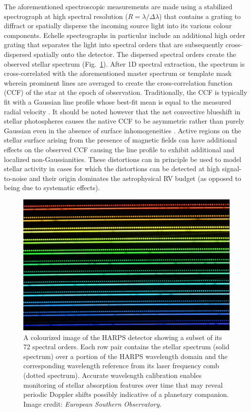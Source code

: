 The aforementioned
spectroscopic measurements are made using a stabilized spectrograph at high spectral resolution
($R=\lambda / \Delta \lambda$) that contains a grating to 
diffract or spatially disperse the incoming source light into its various colour components.
Echelle spectrographs in particular include an additional high order grating that separates the
light into spectral orders that are subsequently cross-dispersed spatially onto the detector. The
dispersed spectral orders create the observed stellar spectrum (Fig.~\ref{fig:harps}).
After 1D spectral extraction, the spectrum is cross-correlated with the aforementioned master spectrum
or template mask wherein prominent lines 
are averaged to create the cross-correlation function (CCF) of the star at the epoch of 
observation. Traditionally, the CCF is typically fit with a Gaussian line profile whose best-fit mean 
is equal to the measured radial velocity \citep{pepe02}. It should be noted however that the net
convective blueshift in stellar photospheres causes the native CCF to be asymmetric rather
than purely Gaussian even in the absence of surface inhomogeneities \citep{gray89}.
Active regions on the stellar surface arising 
from the presence of magnetic fields can have additional effects on the observed CCF 
causing the line profile to exhibit additional and localized non-Gaussianities. 
These distortions can in principle be used to model stellar activity in cases for which the distortions
can be detected at high signal-to-noise and their origin dominates the astrophysical RV budget (as opposed
to being due to systematic effects). \\

\begin{figure}
  \centering
  \includegraphics[width=0.8\hsize]{figures/20140904_harps-lasercomb.jpg}
  \caption[Image of spectral orders from the HARPS echelle spectrograph.]
      {A colourized image of the HARPS detector showing a subset of its 72 spectral orders.
    Each row pair contains the stellar spectrum (solid spectrum) over a portion of the HARPS wavelength
    domain and the corresponding wavelength reference from its laser frequency comb (dotted spectrum).
    Accurate wavelength calibration enables monitoring of stellar absorption features over time that
    may reveal periodic Doppler shifts possibly indicative of a planetary companion.
    Image credit: \emph{European Southern Observatory}.}
  \label{fig:harps}
\end{figure}


